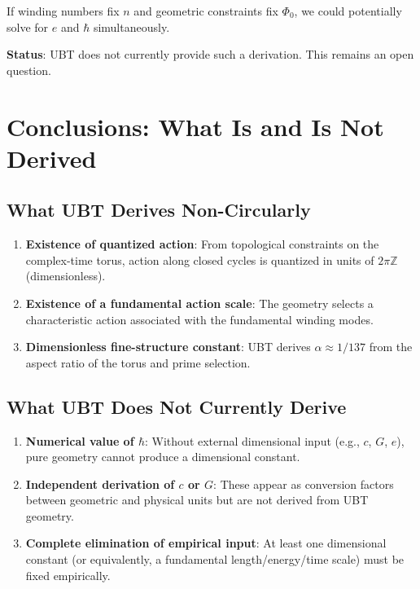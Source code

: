 \documentclass[12pt]{article}
\begin{document}
If winding numbers fix $n$ and geometric constraints fix $\Phi_0$, we could potentially solve for $e$ and $\hbar$ simultaneously.

\textbf{Status}: UBT does not currently provide such a derivation. This remains an open question.

\section{Conclusions: What Is and Is Not Derived}

\subsection{What UBT Derives Non-Circularly}

\begin{enumerate}
\item \textbf{Existence of quantized action}: From topological constraints on the complex-time torus, action along closed cycles is quantized in units of $2\pi \mathbb{Z}$ (dimensionless).

\item \textbf{Existence of a fundamental action scale}: The geometry selects a characteristic action associated with the fundamental winding modes.

\item \textbf{Dimensionless fine-structure constant}: UBT derives $\alpha \approx 1/137$ from the aspect ratio of the torus and prime selection.
\end{enumerate}

\subsection{What UBT Does Not Currently Derive}

\begin{enumerate}
\item \textbf{Numerical value of $\hbar$}: Without external dimensional input (e.g., $c$, $G$, $e$), pure geometry cannot produce a dimensional constant.

\item \textbf{Independent derivation of $c$ or $G$}: These appear as conversion factors between geometric and physical units but are not derived from UBT geometry.

\item \textbf{Complete elimination of empirical input}: At least one dimensional constant (or equivalently, a fundamental length/energy/time scale) must be fixed empirically.
\end{enumerate}
\end{document}
